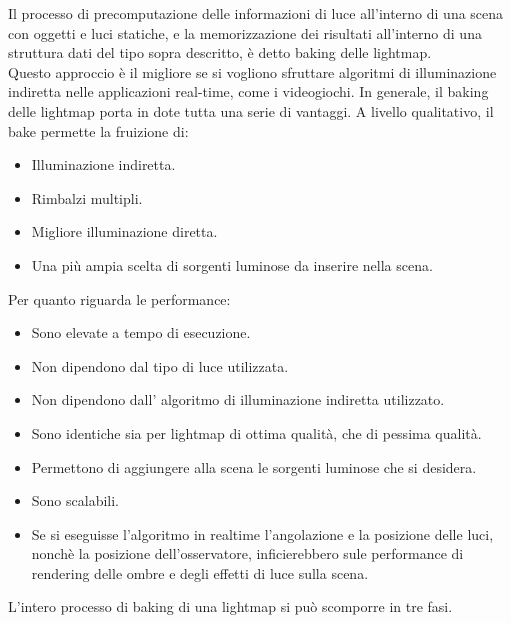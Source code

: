 Il processo di precomputazione delle informazioni di luce all’interno di una scena con oggetti e luci statiche, e la memorizzazione dei risultati all’interno di una struttura dati del tipo sopra descritto, è detto baking delle lightmap. 
\\
Questo approccio è il migliore se si vogliono sfruttare algoritmi di illuminazione indiretta nelle applicazioni real-time, come i videogiochi. In generale, il baking delle lightmap porta in dote tutta una serie di vantaggi.
A livello qualitativo, il bake permette la fruizione di:
\begin{itemize}
\item Illuminazione indiretta.
\item Rimbalzi multipli.
\item Migliore illuminazione diretta.
\item Una più ampia scelta di sorgenti luminose da inserire nella scena.
\end{itemize}
Per quanto riguarda le performance:
\begin{itemize}
\item Sono elevate a tempo di esecuzione.
\item Non dipendono dal tipo di luce utilizzata.
\item Non dipendono dall’ algoritmo di illuminazione indiretta utilizzato.
\item Sono identiche sia per lightmap di ottima qualità, che di pessima qualità.
\item Permettono di aggiungere alla scena le sorgenti luminose che si desidera.
\item Sono scalabili.
\item Se si eseguisse l’algoritmo in realtime l’angolazione e la posizione delle luci, nonchè la posizione dell’osservatore, inficierebbero sule performance di rendering delle ombre e degli effetti di luce sulla scena.
\end{itemize}
L’intero processo di baking di una lightmap si può scomporre in tre fasi.
\\

